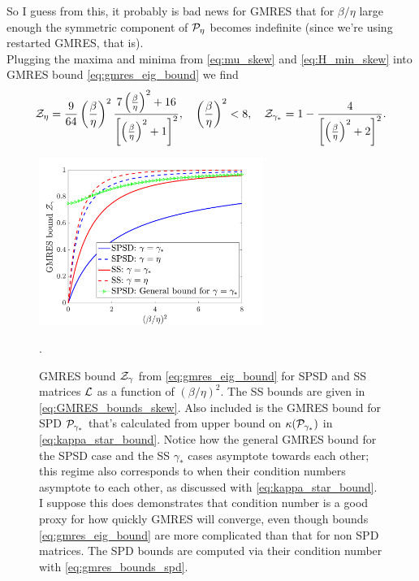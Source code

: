 \documentclass[a4paper,10pt]{article}
\begin{document}
{So I guess from this, it probably is bad news for GMRES that for $\beta/\eta$ large enough the symmetric component of ${\cal P}_{\eta}$ becomes indefinite (since we're using restarted GMRES, that is).\\

Plugging the maxima and minima from \eqref{eq:mu_skew} and \eqref{eq:H_min_skew} into GMRES bound \eqref{eq:gmres_eig_bound} we find
\begin{align}
\label{eq:GMRES_bounds_skew}
{\cal Z}_{\eta} 
= 
\frac{9}{64} \left( \frac{\beta}{\eta} \right)^2 \frac{7 \left( \frac{\beta}{\eta} \right)^2 + 16}{\left[ \left( \frac{\beta}{\eta} \right)^2 + 1 \right]^2}, 
\quad 
\left( \frac{\beta}{\eta} \right)^2 < 8, 
\quad
{\cal Z}_{\gamma_*} = 1 - \frac{4}{\left[\left( \frac{\beta}{\eta} \right)^2 + 2 \right]^2}.
\end{align}



\begin{figure}[!htb]
\label{fig:gmres_bounds}
\centering
\includegraphics[width=0.65\textwidth]{figures/gmres_bounds_spsd_ss}
\caption{GMRES bound ${\cal Z}_{\gamma}$ from \eqref{eq:gmres_eig_bound} for SPSD and SS matrices ${\cal L}$ as a function of $(\beta/\eta)^2$. The SS bounds are given in \eqref{eq:GMRES_bounds_skew}. Also included is the GMRES bound for SPD ${\cal P}_{\gamma_*}$ that's calculated from upper bound on $\kappa({\cal P}_{\gamma_*})$ in \eqref{eq:kappa_star_bound}. Notice how the general GMRES bound for the SPSD case and the SS $\gamma_*$ cases asymptote towards each other; this regime also corresponds to when their condition numbers asymptote to each other, as discussed with \eqref{eq:kappa_star_bound}. I suppose this does demonstrates that condition number is a good proxy for how quickly GMRES will converge, even though bounds \eqref{eq:gmres_eig_bound} are more complicated than that for non SPD matrices. The SPD bounds are computed via their condition number with \eqref{eq:gmres_bounds_spd}.}.
\end{figure}

}
\end{document}
